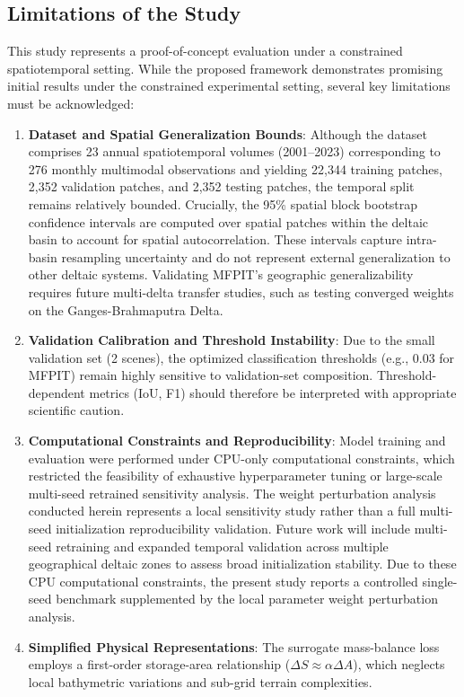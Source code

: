 \documentclass[preprint,12pt]{elsarticle}
\begin{document}
\subsection{Limitations of the Study}
This study represents a proof-of-concept evaluation under a constrained spatiotemporal setting. While the proposed framework demonstrates promising initial results under the constrained experimental setting, several key limitations must be acknowledged:
\begin{enumerate}
    \item \textbf{Dataset and Spatial Generalization Bounds}: Although the dataset comprises 23 annual spatiotemporal volumes (2001--2023) corresponding to 276 monthly multimodal observations and yielding 22,344 training patches, 2,352 validation patches, and 2,352 testing patches, the temporal split remains relatively bounded. Crucially, the 95\% spatial block bootstrap confidence intervals are computed over spatial patches within the deltaic basin to account for spatial autocorrelation. These intervals capture intra-basin resampling uncertainty and do not represent external generalization to other deltaic systems. Validating MFPIT's geographic generalizability requires future multi-delta transfer studies, such as testing converged weights on the Ganges-Brahmaputra Delta.
    \item \textbf{Validation Calibration and Threshold Instability}: Due to the small validation set (2 scenes), the optimized classification thresholds (e.g., 0.03 for MFPIT) remain highly sensitive to validation-set composition. Threshold-dependent metrics (IoU, F1) should therefore be interpreted with appropriate scientific caution.
    \item \textbf{Computational Constraints and Reproducibility}: Model training and evaluation were performed under CPU-only computational constraints, which restricted the feasibility of exhaustive hyperparameter tuning or large-scale multi-seed retrained sensitivity analysis. The weight perturbation analysis conducted herein represents a local sensitivity study rather than a full multi-seed initialization reproducibility validation. Future work will include multi-seed retraining and expanded temporal validation across multiple geographical deltaic zones to assess broad initialization stability. Due to these CPU computational constraints, the present study reports a controlled single-seed benchmark supplemented by the local parameter weight perturbation analysis.
    \item \textbf{Simplified Physical Representations}: The surrogate mass-balance loss employs a first-order storage-area relationship ($\Delta S \approx \alpha \Delta A$), which neglects local bathymetric variations and sub-grid terrain complexities.
\end{enumerate}
\end{document}
